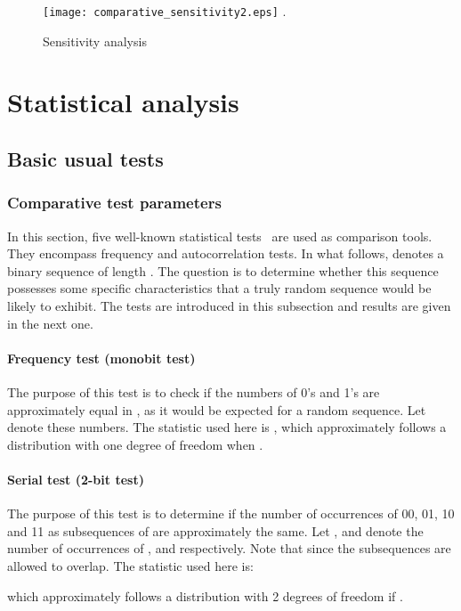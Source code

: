\documentclass[10pt, a4paper, conference, compsocconf]{IEEEtran}
\begin{document}
\begin{figure}
\centering
\texttt{[image: comparative\_sensitivity2.eps]}
\DeclareGraphicsExtensions.
\caption{Sensitivity analysis}
\label{Sensitivity analysis}
\end{figure}

\section{Statistical analysis}
\label{Comparative analysis}
\subsection{Basic usual tests}


\subsubsection{Comparative test parameters}
In this section, five well-known statistical tests~\cite{Menezes1997} are used as  comparison tools. They encompass frequency and autocorrelation tests. In what follows,  denotes a binary sequence of length . The question is to determine whether this sequence possesses some specific characteristics that a truly random sequence would be likely to exhibit. The tests are introduced in this subsection and results are given in the next one.

\paragraph{Frequency test (monobit test)}
The purpose of this test is to check if the numbers of 0's and 1's are approximately equal in , as it would be expected for a random sequence. Let  denote these numbers. The statistic used here is , which approximately follows a  distribution with one degree of freedom when .

\paragraph{Serial test (2-bit test)}
The purpose of this test is to determine if the number of occurrences of 00, 01, 10 and 11 as subsequences of  are approximately the same. Let , and  denote the number of occurrences of , and  respectively. Note that  since the subsequences are allowed to overlap. The
statistic used here is:\newline

\noindent which approximately follows a  distribution with 2 degrees of freedom if .
\end{document}
